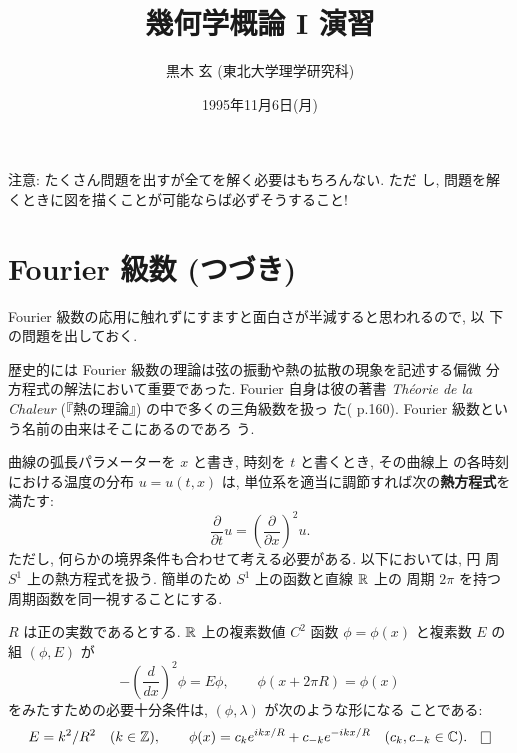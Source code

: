 \documentclass[12pt,twoside]{jarticle}
\def\Z{{\Bbb Z}} %
\def\R{{\Bbb R}} %
\def\C{{\Bbb C}} %
\def\od#1#2{\frac{d #1}{d #2}}
\def\pd#1#2{\frac{\partial #1}{\partial #2}}
\begin{document}

\title{\bf 幾何学概論 I 演習}

\author{黒木 玄 \quad (東北大学理学研究科)}

\date{1995年11月6日(月)}

\maketitle



\noindent 注意: たくさん問題を出すが全てを解く必要はもちろんない. ただ
し, 問題を解くときに図を描くことが可能ならば必ずそうすること!


\section{Fourier 級数 (つづき)}

Fourier 級数の応用に触れずにすますと面白さが半減すると思われるので, 以
下の問題を出しておく.

歴史的には Fourier 級数の理論は弦の振動や熱の拡散の現象を記述する偏微
分方程式の解法において重要であった. Fourier 自身は彼の著書 %
{\it Th\'eorie de la Chaleur} (『熱の理論』) の中で多くの三角級数を扱っ
た(\cite{WW} p.160). Fourier 級数という名前の由来はそこにあるのであろ
う.

曲線の弧長パラメーターを $x$ と書き, 時刻を $t$ と書くとき, その曲線上
の各時刻における温度の分布 $u = u(t,x)$ は, %
単位系を適当に調節すれば次の{\bf 熱方程式}を満たす:
\[
  \pd{}{t} u = \left( \pd{}{x} \right)^2 u.
\]%
ただし, 何らかの境界条件も合わせて考える必要がある. 以下においては, 円
周 $S^1$ 上の熱方程式を扱う. 簡単のため $S^1$ 上の函数と直線 $\R$ 上の
周期 $2\pi$ を持つ周期函数を同一視することにする.

\begin{question}\label{q:heat1}
  $R$ は正の実数であるとする. %
  $\R$ 上の複素数値 $C^2$ 函数 $\phi = \phi(x)$ と複素数 $E$ の組 %
  $(\phi, E)$ が
  \[
    - \left( \od{}{x} \right)^2 \phi = E \phi,
    \qquad
    \phi(x + 2 \pi R) = \phi(x)
  \]%
  をみたすための必要十分条件は, $(\phi, \lambda)$ が次のような形になる
  ことである:
  \[
    E = k^2/R^2
    \quad
    (k \in \Z),
    \qquad
    \phi(x)
    =
    c_k    e^{ikx/R} + c_{-k} e^{-ikx/R}
    \quad
    (c_k, c_{-k} \in \C).
    \qed
  \]
\end{question}
\end{document}
